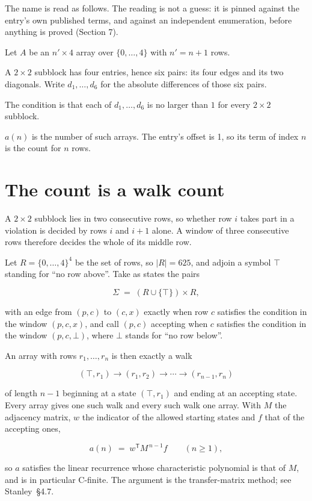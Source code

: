 \documentclass[11pt]{article}
\theoremstyle{definition}
\begin{document}
The name is read as follows. The reading is not a guess: it is pinned against the entry's own published terms, and against an independent enumeration, before anything is proved (Section 7).

Let $A$ be an $n' \times 4$ array over $\{0,\dots,4\}$ with $n' = n + 1$ rows.

A $2\times2$ subblock has four entries, hence six pairs: its four edges and its two diagonals. Write $d_1,\dots,d_6$ for the absolute differences of those six pairs.

The condition is that each of $d_1,\dots,d_6$ is no larger than $1$ for every $2\times2$ subblock.

$a(n)$ is the number of such arrays. The entry's offset is 1, so its term of index $n$ is the count for $n$ rows.

\section{The count is a walk count}

A $2\times2$ subblock lies in two consecutive rows, so whether row $i$ takes part in a violation is decided by rows $i$ and $i+1$ alone. A window of three consecutive rows therefore decides the whole of its middle row.

Let $R = \{0,\dots,4\}^{4}$ be the set of rows, so $|R| = 625$, and adjoin a symbol $\top$ standing for ``no row above''. Take as states the pairs

\[\Sigma \;=\; (R \cup \{\top\}) \times R,\]

with an edge from $(p,c)$ to $(c,x)$ exactly when row $c$ satisfies the condition in the window $(p,c,x)$, and call $(p,c)$ accepting when $c$ satisfies the condition in the window $(p,c,\bot)$, where $\bot$ stands for ``no row below''.

An array with rows $r_1,\dots,r_n$ is then exactly a walk

\[(\top,r_1) \to (r_1,r_2) \to \cdots \to (r_{n-1},r_n)\]

of length $n-1$ beginning at a state $(\top,r_1)$ and ending at an accepting state. Every array gives one such walk and every such walk one array. With $M$ the adjacency matrix, $w$ the indicator of the allowed starting states and $f$ that of the accepting ones,

\[a(n) \;=\; w^{\mathsf T} M^{\,n-1} f \qquad (n \ge 1),\]

so $a$ satisfies the linear recurrence whose characteristic polynomial is that of $M$, and is in particular C-finite. The argument is the transfer-matrix method; see Stanley~\S4.7.
\end{document}
